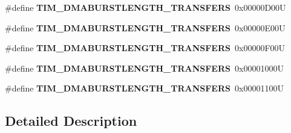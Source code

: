 \begin{DoxyCompactItemize}
\#define {\bfseries T\+I\+M\+\_\+\+D\+M\+A\+B\+U\+R\+S\+T\+L\+E\+N\+G\+T\+H\+\_\+T\+R\+A\+N\+S\+F\+E\+RS}~0x00000\+D00U
\item 
\mbox{\label{group___t_i_m___d_m_a___burst___length_ga98a4d88c533178bc1b4347e4c5ce815a}} 
\#define {\bfseries T\+I\+M\+\_\+\+D\+M\+A\+B\+U\+R\+S\+T\+L\+E\+N\+G\+T\+H\+\_\+T\+R\+A\+N\+S\+F\+E\+RS}~0x00000\+E00U
\item 
\mbox{\label{group___t_i_m___d_m_a___burst___length_gaf4b2a1fe12c52272544c21e17de1ed90}} 
\#define {\bfseries T\+I\+M\+\_\+\+D\+M\+A\+B\+U\+R\+S\+T\+L\+E\+N\+G\+T\+H\+\_\+T\+R\+A\+N\+S\+F\+E\+RS}~0x00000\+F00U
\item 
\mbox{\label{group___t_i_m___d_m_a___burst___length_gad31c1fca7ed436a53efc4f290144584d}} 
\#define {\bfseries T\+I\+M\+\_\+\+D\+M\+A\+B\+U\+R\+S\+T\+L\+E\+N\+G\+T\+H\+\_\+T\+R\+A\+N\+S\+F\+E\+RS}~0x00001000U
\item 
\mbox{\label{group___t_i_m___d_m_a___burst___length_gabb6f72b02ee1c8855de241cb0713e2ca}} 
\#define {\bfseries T\+I\+M\+\_\+\+D\+M\+A\+B\+U\+R\+S\+T\+L\+E\+N\+G\+T\+H\+\_\+T\+R\+A\+N\+S\+F\+E\+RS}~0x00001100U
\end{DoxyCompactItemize}


\subsection{Detailed Description}
